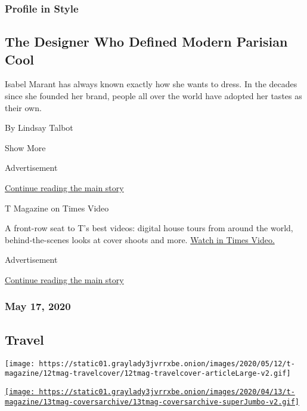 \begin{enumerate}
  \hypertarget{profile-in-style}{%
  \subsubsection{Profile in Style}\label{profile-in-style}}

  \hypertarget{the-designer-who-defined-modern-parisian-cool}{%
  \subsection{The Designer Who Defined Modern Parisian
  Cool}\label{the-designer-who-defined-modern-parisian-cool}}

  Isabel Marant has always known exactly how she wants to dress. In the
  decades since she founded her brand, people all over the world have
  adopted her tastes as their own.

  By Lindsay Talbot
\end{enumerate}

Show More

Advertisement

\protect\hyperlink{after-mid2}{Continue reading the main story}

T Magazine on Times Video

A front-row seat to T's best videos: digital house tours from around the
world, behind-the-scenes looks at cover shoots and more.
\href{https://www.nytimes3xbfgragh.onion/video/t-magazine}{Watch in
Times Video.}

Advertisement

\protect\hyperlink{after-mktg}{Continue reading the main story}

\hypertarget{may-17-2020}{%
\subsubsection{May 17, 2020}\label{may-17-2020}}

\href{https://www.nytimes3xbfgragh.onion/issue/t-magazine/2020/05/02/ts-may-17-travel-issue}{}

\hypertarget{travel}{%
\subsection{Travel}\label{travel}}

\texttt{[image: https://static01.graylady3jvrrxbe.onion/images/2020/05/12/t-magazine/12tmag-travelcover/12tmag-travelcover-articleLarge-v2.gif]}

\href{https://www.nytimes3xbfgragh.onion/issue/t-magazine/2020/04/12/ts-april-19-culture-issue}{\texttt{[image: https://static01.graylady3jvrrxbe.onion/images/2020/04/13/t-magazine/13tmag-coversarchive/13tmag-coversarchive-superJumbo-v2.gif]}}

